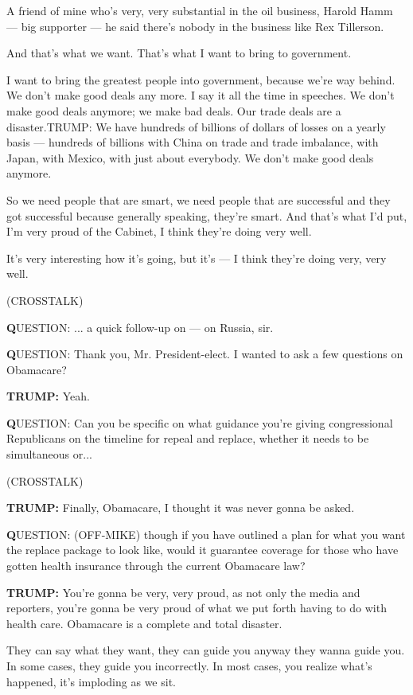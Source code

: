 A friend of mine who's very, very substantial in the oil business,
Harold Hamm --- big supporter --- he said there's nobody in the business
like Rex Tillerson.

And that's what we want. That's what I want to bring to government.

I want to bring the greatest people into government, because we're way
behind. We don't make good deals any more. I say it all the time in
speeches. We don't make good deals anymore; we make bad deals. Our trade
deals are a disaster.TRUMP: We have hundreds of billions of dollars of
losses on a yearly basis --- hundreds of billions with China on trade
and trade imbalance, with Japan, with Mexico, with just about everybody.
We don't make good deals anymore.

So we need people that are smart, we need people that are successful and
they got successful because generally speaking, they're smart. And
that's what I'd put, I'm very proud of the Cabinet, I think they're
doing very well.

It's very interesting how it's going, but it's --- I think they're doing
very, very well.

(CROSSTALK)

\textbf{Q}UESTION: ... a quick follow-up on --- on Russia, sir.

\textbf{Q}UESTION: Thank you, Mr. President-elect. I wanted to ask a few
questions on Obamacare?

\textbf{TRUMP:} Yeah.

\textbf{Q}UESTION: Can you be specific on what guidance you're giving
congressional Republicans on the timeline for repeal and replace,
whether it needs to be simultaneous or...

(CROSSTALK)

\textbf{TRUMP:} Finally, Obamacare, I thought it was never gonna be
asked.

\textbf{Q}UESTION: (OFF-MIKE) though if you have outlined a plan for
what you want the replace package to look like, would it guarantee
coverage for those who have gotten health insurance through the current
Obamacare law?

\textbf{TRUMP:} You're gonna be very, very proud, as not only the media
and reporters, you're gonna be very proud of what we put forth having to
do with health care. Obamacare is a complete and total disaster.

They can say what they want, they can guide you anyway they wanna guide
you. In some cases, they guide you incorrectly. In most cases, you
realize what's happened, it's imploding as we sit.

